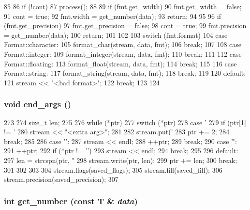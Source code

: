 \begin{DoxyCode}
85     {
86         if (!cont)
87             process();
88 
89         if (fmt.get_width) {
90             fmt.get_width = false;
91             cont = true;
92             fmt.width = get_number(data);
93             return;
94         }
95             
96         if (fmt.get_precision) {
97             fmt.get_precision = false;
98             cont = true;
99             fmt.precision = get_number(data);
100             return;
101         }
102 
103         switch (fmt.format) {
104           case Format::character:
105             format_char(stream, data, fmt);
106             break;
107 
108           case Format::integer:
109             format_integer(stream, data, fmt);
110             break;
111 
112           case Format::floating:
113             format_float(stream, data, fmt);
114             break;
115 
116           case Format::string:
117             format_string(stream, data, fmt);
118             break;
119 
120           default:
121             stream << "<bad format>";
122             break;
123         }
124     }
\end{DoxyCode}
\hypertarget{structcp_1_1Print_a0ae4493963eb6565c9bba273103eebef}{
\subsubsection[{end\_\-args}]{\setlength{\rightskip}{0pt plus 5cm}void end\_\-args ()}}
\label{structcp_1_1Print_a0ae4493963eb6565c9bba273103eebef}



\begin{DoxyCode}
273 {
274     size_t len;
275 
276     while (*ptr) {
277         switch (*ptr) {
278           case '%
279             if (ptr[1] != '%
280                 stream << "<extra arg>";
281 
282             stream.put('%
283             ptr += 2;
284             break;
285 
286           case '\n':
287             stream << endl;
288             ++ptr;
289             break;
290           case '\r':
291             ++ptr;
292             if (*ptr != '\n')
293                 stream << endl;
294             break;
295 
296           default:
297             len = strcspn(ptr, "%
298             stream.write(ptr, len);
299             ptr += len;
300             break;
301         }
302     }
303 
304     stream.flags(saved_flags);
305     stream.fill(saved_fill);
306     stream.precision(saved_precision);
307 }
\end{DoxyCode}
\hypertarget{structcp_1_1Print_ae054da72c78b75437feddec4c6ad9f3d}{
\subsubsection[{get\_\-number}]{\setlength{\rightskip}{0pt plus 5cm}int get\_\-number (const T \& {\em data})}}
\label{structcp_1_1Print_ae054da72c78b75437feddec4c6ad9f3d}



